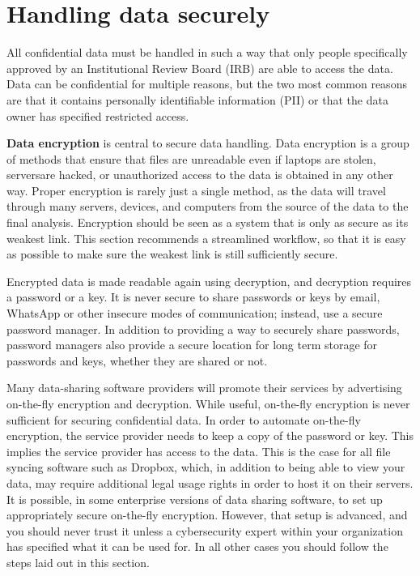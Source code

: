 \section{Handling data securely}

All confidential data must be handled in such a way that only people specifically 
approved by an Institutional Review Board (IRB)
are able to access the data.
Data can be confidential for multiple reasons, but the two most
common reasons are that it contains personally identifiable information (PII)
or that the data owner has specified restricted access.

\textbf{Data encryption} is central to secure data handling. 
Data encryption is a group of methods that ensure that files are unreadable 
even if laptops are stolen, serversare hacked, 
or unauthorized access to the data is obtained in any other way.
Proper encryption is rarely just a single method,
as the data will travel through many servers, devices, and computers
from the source of the data to the final analysis.
Encryption should be seen as a system that is only as secure as its weakest link.
This section recommends a streamlined workflow,
so that it is easy as possible to make sure the weakest link is still sufficiently secure.

Encrypted data is made readable again using decryption,
and decryption requires a password or a key.
It is never secure to share passwords or keys by email,
WhatsApp or other insecure modes of communication;
instead, use a secure password manager.
In addition to providing a way to securely share passwords,
password managers also provide a secure location
for long term storage for passwords and keys, whether they are shared or not.

Many data-sharing software providers will promote their services
by advertising on-the-fly encryption and decryption.
While useful, on-the-fly encryption is never sufficient for securing confidential data.
In order to automate on-the-fly encryption,
the service provider needs to keep a copy of the password or key.
This implies the service provider has access to the data.
This is the case for all file syncing software such as Dropbox,
which, in addition to being able to view your data, may require
additional legal usage rights in order to host it on their servers.
It is possible, in some enterprise versions of data sharing software,
to set up appropriately secure on-the-fly encryption.
However, that setup is advanced, and you should never trust it
unless a cybersecurity expert within your organization
has specified what it can be used for.
In all other cases you should follow the steps laid out in this section.


